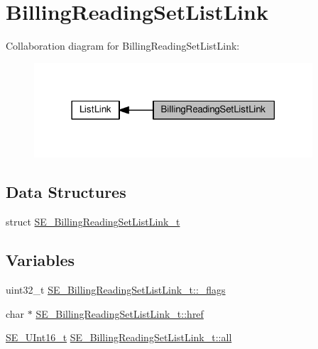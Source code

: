 \hypertarget{group__BillingReadingSetListLink}{}\section{Billing\+Reading\+Set\+List\+Link}
\label{group__BillingReadingSetListLink}
Collaboration diagram for Billing\+Reading\+Set\+List\+Link\+:\nopagebreak
\begin{figure}[H]
\begin{center}
\leavevmode
\includegraphics[width=294pt]{group__BillingReadingSetListLink}
\end{center}
\end{figure}
\subsection*{Data Structures}
\begin{DoxyCompactItemize}
\item 
struct \hyperlink{structSE__BillingReadingSetListLink__t}{S\+E\+\_\+\+Billing\+Reading\+Set\+List\+Link\+\_\+t}
\end{DoxyCompactItemize}
\subsection*{Variables}
\begin{DoxyCompactItemize}
\item 
uint32\+\_\+t \hyperlink{group__BillingReadingSetListLink_ga7cfb529e92b421be1aa44dfcbb17909b}{S\+E\+\_\+\+Billing\+Reading\+Set\+List\+Link\+\_\+t\+::\+\_\+flags}
\item 
char $\ast$ \hyperlink{group__BillingReadingSetListLink_gabf4398b5db8e7276bafa26793d8db6bc}{S\+E\+\_\+\+Billing\+Reading\+Set\+List\+Link\+\_\+t\+::href}
\item 
\hyperlink{group__UInt16_gac68d541f189538bfd30cfaa712d20d29}{S\+E\+\_\+\+U\+Int16\+\_\+t} \hyperlink{group__BillingReadingSetListLink_ga317f96fbbbd92707b6af50aaa8fa2865}{S\+E\+\_\+\+Billing\+Reading\+Set\+List\+Link\+\_\+t\+::all}
\end{DoxyCompactItemize}



